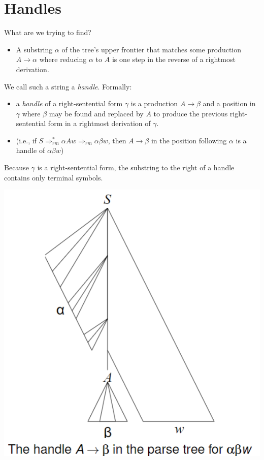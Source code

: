 \documentclass[10pt]{article}
\begin{document}
\section*{Handles}
What are we trying to find?
\begin{itemize}
    \item A substring $\alpha$ of the tree's upper frontier that matches some production $A \rightarrow \alpha$ where reducing $\alpha$ to $A$ is one step in the reverse of a rightmost derivation.
\end{itemize}
We call such a string a \textit{handle}.  Formally:
\begin{itemize}
    \item a \textit{handle} of a right-sentential form $\gamma$ is a production $A \rightarrow \beta$ and a position in $\gamma$ where $\beta$ may be found and replaced by $A$ to produce the previous right-sentential form in a rightmost derivation of $\gamma$.
    \item (i.e., if $S \Rightarrow_{rm}^* \alpha Aw \Rightarrow_{rm} \alpha \beta w$, then $A \rightarrow \beta$ in the position following $\alpha$ is a handle of $\alpha \beta w$)
\end{itemize}
Because $\gamma$ is a right-sentential form, the substring to the right of a handle contains only terminal symbols.
\begin{center}
    \includegraphics*[scale=1]{W7_1.png}
\end{center}
\end{document}
